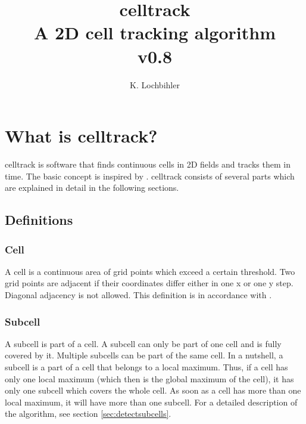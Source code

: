 \documentclass{scrartcl}
\title{celltrack\\
	A 2D cell tracking algorithm\\ \medskip
	v0.8}
\author{K. Lochbihler}
\begin{document}
	
\maketitle

\section{What is celltrack?}
celltrack is software that finds continuous cells in 2D fields and tracks them in time. The basic concept is inspired by \cite{moseley2013}. celltrack consists of several parts which are explained in detail in the following sections.

\subsection{Definitions}

\subsubsection*{Cell}
A cell is a continuous area of grid points which exceed a certain threshold. Two grid points are adjacent if their coordinates differ either in one x or one y step. Diagonal adjacency is not allowed. This definition is in accordance with \cite{moseley2013}.

\subsubsection*{Subcell}
A subcell is part of a cell. A subcell can only be part of one cell and is fully covered by it. Multiple subcells can be part of the same cell. In a nutshell, a subcell is a part of a cell that belongs to a local maximum. Thus, if a cell has only one local maximum (which then is the global maximum of the cell), it has only one subcell which covers the whole cell. As soon as a cell has more than one local maximum, it will have more than one subcell. For a detailed description of the algorithm, see section \ref{sec:detectsubcells}.
\end{document}
